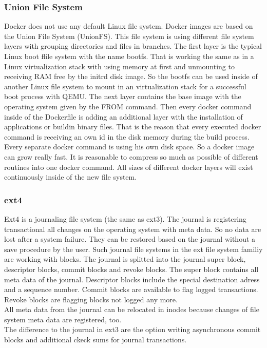 \subsubsection{Union File System}

Docker does not use any default Linux file system. 
Docker images are based on the Union File System (UnionFS)\cite[~p.21]{Ashraf2015}. 
This file system is using different file system layers with grouping directories and files in branches. 
The first layer is the typical Linux boot flile system with the name bootfs. 
That is working the same as in a Linux virtualization stack with using memory at first and unmounting to receiving RAM free by the initrd disk image. 
So the bootfs can be used inside of another Linux file system to mount in an virtualization stack for a successful boot process with QEMU.
The next layer contains the base image with the operating system given by the \ldq FROM \rdq command.
Then every docker command inside of the Dockerfile is adding an additional layer with the installation of applications or buildin binary files.
That is the reason that every executed docker command is receiving an own id in the disk memory during the build process.
Every separate docker command is using his own disk space. So a docker image can grow really fast.
It is reasonable to compress so much as possible of different routines into one docker command. 
All sizes of different docker layers will exist continuously inside of the new file system.

\subsubsection{ext4}

Ext4 is a journaling file system (the same as ext3). The journal is registering transactional all changes on the operating system with meta data.
So no data  are lost after a system failure. They can be restored based on the journal without a save procedure by the user.
Such journal file systems in the ext file system familiy are working with blocks\cite[~p.20]{Seufert2015}.
The journal is splitted into the journal super block, descriptor blocks, commit blocks and revoke blocks.
The super block contains all meta data of the journal. Descriptor blocks include the special destination adress and a sequence number. 
Commit blocks are available to flag logged transactions.
Revoke blocks are flagging blocks not logged any more. \\
All meta data from the journal can be relocated in inodes because changes of file system meta data are registered, too. \\
The difference to the journal in ext3 are the option writing asynchronous commit blocks and additional ckeck sums for journal transactions\cite[p.28]{Seufert2015}.

